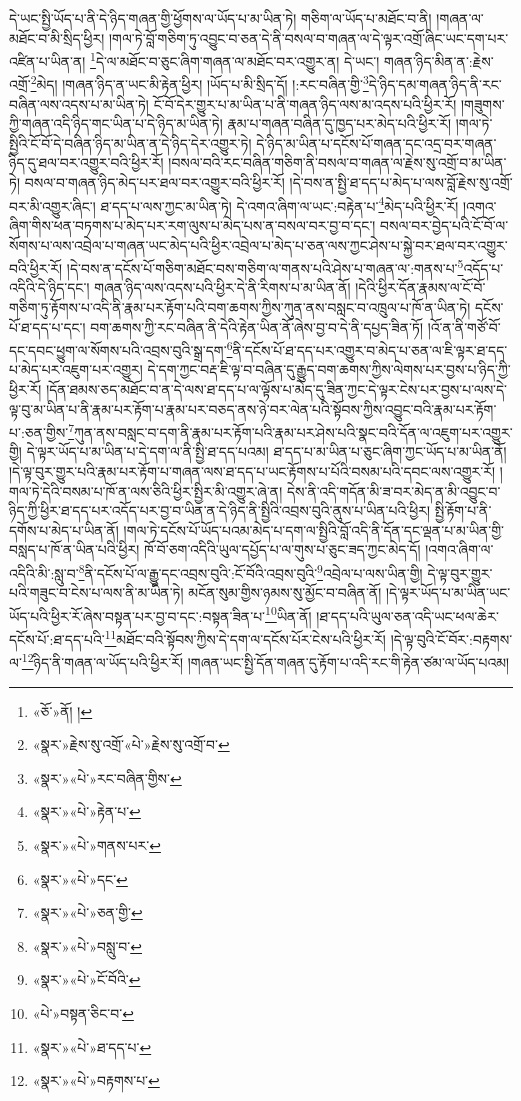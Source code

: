 དེ་ཡང་སྤྱི་ཡོད་པ་ནི་དེ་ཉིད་གཞན་གྱི་ཕྱོགས་ལ་ཡོད་པ་མ་ཡིན་ཏེ། གཅིག་ལ་ཡོད་པ་མཐོང་བ་ནི། །གཞན་ལ་མཐོང་བ་མི་སྲིད་ཕྱིར། །གལ་ཏེ་བློ་གཅིག་ཏུ་འབྱུང་བ་ཅན་དེ་ནི་བསལ་བ་གཞན་ལ་དེ་ལྟར་འགྲོ་ཞིང་ཡང་དག་པར་འཛིན་པ་ཡིན་ན། \footnote{«ཅོ་»ནོ། ། }དེ་ལ་མཐོང་བ་ཅུང་ཞིག་གཞན་ལ་མཐོང་བར་འགྱུར་ན། དེ་ཡང་། གཞན་ཉིད་མིན་ན་:རྗེས་འགྲོ་\footnote{«སྣར་»རྗེས་སུ་འགྲོ་«པེ་»རྗེས་སུ་འགྲོ་བ་}མེད། །གཞན་ཉིད་ན་ཡང་མི་རྟེན་ཕྱིར། །ཡོད་པ་མི་སྲིད་དོ། །:རང་བཞིན་གྱི་\footnote{«སྣར་»«པེ་»རང་བཞིན་གྱིས་}དེ་ཉིད་དམ་གཞན་ཉིད་ནི་རང་བཞིན་ལས་འདས་པ་མ་ཡིན་ཏེ། ངོ་བོ་དེར་གྱུར་པ་མ་ཡིན་པ་ནི་གཞན་ཉིད་ལས་མ་འདས་པའི་ཕྱིར་རོ། །གཟུགས་ཀྱི་གཞན་འདི་ཉིད་གང་ཡིན་པ་དེ་ཉིད་མ་ཡིན་ཏེ། རྣམ་པ་གཞན་བཞིན་དུ་ཁྱད་པར་མེད་པའི་ཕྱིར་རོ། །གལ་ཏེ་སྤྱིའི་ངོ་བོ་དེ་བཞིན་ཉིད་མ་ཡིན་ན་དེ་ཉིད་དེར་འགྱུར་ཏེ། དེ་ཉིད་མ་ཡིན་པ་དངོས་པོ་གཞན་དང་འདྲ་བར་གཞན་ཉིད་དུ་ཐལ་བར་འགྱུར་བའི་ཕྱིར་རོ། །བསལ་བའི་རང་བཞིན་གཅིག་ནི་བསལ་བ་གཞན་ལ་རྗེས་སུ་འགྲོ་བ་མ་ཡིན་ཏེ། བསལ་བ་གཞན་ཉིད་མེད་པར་ཐལ་བར་འགྱུར་བའི་ཕྱིར་རོ། །དེ་བས་ན་སྤྱི་ཐ་དད་པ་མེད་པ་ལས་བློ་རྗེས་སུ་འགྲོ་བར་མི་འགྱུར་ཞིང་། ཐ་དད་པ་ལས་ཀྱང་མ་ཡིན་ཏེ། དེ་འགའ་ཞིག་ལ་ཡང་:བརྟེན་པ་\footnote{«སྣར་»«པེ་»རྟེན་པ་}མེད་པའི་ཕྱིར་རོ། །འགའ་ཞིག་གིས་ཕན་བཏགས་པ་མེད་པར་རག་ལུས་པ་མེད་པས་ན་བསལ་བར་བྱ་བ་དང་། བསལ་བར་བྱེད་པའི་ངོ་བོ་ལ་སོགས་པ་ལས་འབྲེལ་པ་གཞན་ཡང་མེད་པའི་ཕྱིར་འབྲེལ་པ་མེད་པ་ཅན་ལས་ཀྱང་ཤེས་པ་སྐྱེ་བར་ཐལ་བར་འགྱུར་བའི་ཕྱིར་རོ། །དེ་བས་ན་དངོས་པོ་གཅིག་མཐོང་བས་གཅིག་ལ་གནས་པའི་ཤེས་པ་གཞན་ལ་:གནས་པ་\footnote{«སྣར་»«པེ་»གནས་པར་}འདོད་པ་འདིའི་དེ་ཉིད་དང་། གཞན་ཉིད་ལས་འདས་པའི་ཕྱིར་དེ་ནི་རིགས་པ་མ་ཡིན་ནོ། །དེའི་ཕྱིར་དོན་རྣམས་ལ་ངོ་བོ་གཅིག་ཏུ་རྟོགས་པ་འདི་ནི་རྣམ་པར་རྟོག་པའི་བག་ཆགས་ཀྱིས་ཀུན་ནས་བསླང་བ་འཁྲུལ་པ་ཁོ་ན་ཡིན་ཏེ། དངོས་པོ་ཐ་དད་པ་དང་། བག་ཆགས་ཀྱི་རང་བཞིན་ནི་དེའི་རྟེན་ཡིན་ནོ་ཞེས་བྱ་བ་དེ་ནི་དཔྱད་ཟིན་ཏོ། །འོ་ན་ནི་གཙོ་བོ་དང་དབང་ཕྱུག་ལ་སོགས་པའི་འབྲས་བུའི་སྒྲ་དག་\footnote{«སྣར་»«པེ་»དང་}ནི་དངོས་པོ་ཐ་དད་པར་འགྱུར་བ་མེད་པ་ཅན་ལ་ཇི་ལྟར་ཐ་དད་པ་མེད་པར་འཇུག་པར་འགྱུར། དེ་དག་ཀྱང་བརྡ་ཇི་ལྟ་བ་བཞིན་དུ་རྒྱུད་བག་ཆགས་ཀྱིས་ལེགས་པར་བྱས་པ་ཉིད་ཀྱི་ཕྱིར་རོ། །དོན་ཐམས་ཅད་མཐོང་བ་ན་དེ་ལས་ཐ་དད་པ་ལ་ལྟོས་པ་མེད་དུ་ཟིན་ཀྱང་དེ་ལྟར་ངེས་པར་བྱས་པ་ལས་དེ་ལྟ་བུ་མ་ཡིན་པ་ནི་རྣམ་པར་རྟོག་པ་རྣམ་པར་བཅད་ནས་ཉེ་བར་ལེན་པའི་སྟོབས་ཀྱིས་འབྱུང་བའི་རྣམ་པར་རྟོག་པ་:ཅན་གྱིས་\footnote{«སྣར་»«པེ་»ཅན་གྱི་}ཀུན་ནས་བསླང་བ་དག་ནི་རྣམ་པར་རྟོག་པའི་རྣམ་པར་ཤེས་པའི་སྣང་བའི་དོན་ལ་འཇུག་པར་འགྱུར་གྱི། དེ་ལྟར་ཡོད་པ་མ་ཡིན་པ་དེ་དག་ལ་ནི་སྤྱི་ཐ་དད་པའམ། ཐ་དད་པ་མ་ཡིན་པ་ཅུང་ཞིག་ཀྱང་ཡོད་པ་མ་ཡིན་ནོ། །དེ་ལྟ་བུར་གྱུར་པའི་རྣམ་པར་རྟོག་པ་གཞན་ལས་ཐ་དད་པ་ཡང་རྟོགས་པ་པོའི་བསམ་པའི་དབང་ལས་འགྱུར་རོ། །གལ་ཏེ་དེའི་བསམ་པ་ཁོ་ན་ལས་ཅིའི་ཕྱིར་སྤྱིར་མི་འགྱུར་ཞེ་ན། དེས་ནི་འདི་གདོན་མི་ཟ་བར་མེད་ན་མི་འབྱུང་བ་ཉིད་ཀྱི་ཕྱིར་ཐ་དད་པར་འདོད་པར་བྱ་བ་ཡིན་ན་དེ་ཉིད་ནི་སྤྱིའི་འབྲས་བུའི་ནུས་པ་ཡིན་པའི་ཕྱིར། སྤྱི་རྟོག་པ་ནི་དགོས་པ་མེད་པ་ཡིན་ནོ། །གལ་ཏེ་དངོས་པོ་ཡོད་པའམ་མེད་པ་དག་ལ་སྤྱིའི་བློ་འདི་ནི་དོན་དང་ལྡན་པ་མ་ཡིན་གྱི་བསླད་པ་ཁོ་ན་ཡིན་པའི་ཕྱིར། ཁོ་བོ་ཅག་འདིའི་ཡུལ་དཔྱོད་པ་ལ་གུས་པ་ཅུང་ཟད་ཀྱང་མེད་དོ། །འགའ་ཞིག་ལ་འདིའི་མི་:སླུ་བ་\footnote{«སྣར་»«པེ་»བསླུ་བ་}ནི་དངོས་པོ་ལ་རྒྱུ་དང་འབྲས་བུའི་:ངོ་བོའི་འབྲས་བུའི་\footnote{«སྣར་»«པེ་»ངོ་བོའི་}འབྲེལ་པ་ལས་ཡིན་གྱི། དེ་ལྟ་བུར་གྱུར་པའི་གཟུང་བ་ངེས་པ་ལས་ནི་མ་ཡིན་ཏེ། མངོན་སུམ་གྱིས་ཉམས་སུ་མྱོང་བ་བཞིན་ནོ། །དེ་ལྟར་ཡོད་པ་མ་ཡིན་ཡང་ཡོད་པའི་ཕྱིར་རོ་ཞེས་བསྟན་པར་བྱ་བ་དང་:བསྟན་ཟིན་པ་\footnote{«པེ་»བསྟན་ཅིང་བ་}ཡིན་ནོ། །ཐ་དད་པའི་ཡུལ་ཅན་འདི་ཡང་ཕལ་ཆེར་དངོས་པོ་:ཐ་དད་པའི་\footnote{«སྣར་»«པེ་»ཐ་དད་པ་}མཐོང་བའི་སྟོབས་ཀྱིས་དེ་དག་ལ་དངོས་པོར་ངེས་པའི་ཕྱིར་རོ། །དེ་ལྟ་བུའི་ངོ་བོར་:བརྟགས་ལ་\footnote{«སྣར་»«པེ་»བརྟགས་པ་}ཉིད་ནི་གཞན་ལ་ཡོད་པའི་ཕྱིར་རོ། །གཞན་ཡང་སྤྱི་དོན་གཞན་དུ་རྟོག་པ་འདི་རང་གི་རྟེན་ཙམ་ལ་ཡོད་པའམ། 